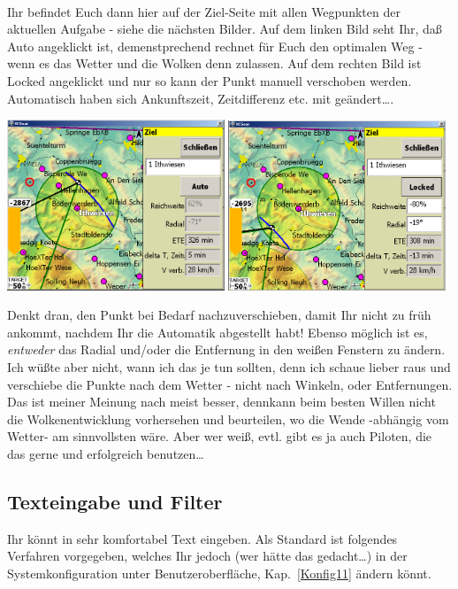 \blink~\blink~\blink~\bblitz


Ihr befindet Euch dann hier auf der \textsf{Ziel}-Seite mit allen Wegpunkten der aktuellen Aufgabe - siehe die nächsten Bilder. Auf dem linken Bild seht Ihr, daß \textsf{Auto} angeklickt ist, demenstprechend rechnet \xc für Euch den optimalen Weg - wenn es das Wetter und die Wolken denn zulassen. Auf dem rechten Bild ist  \textsf{Locked} angeklickt und nur so kann der  Punkt manuell verschoben werden. Automatisch haben sich Ankunftszeit, Zeitdifferenz etc. mit geändert\dots.
\begin{center}
\includegraphics[width=6.5cm]{Bilder/AAT-Verschieb0.png}%
\qquad
\includegraphics[width=6.5cm]{Bilder/AAT-Verschieb2.png}%
\end{center}

Denkt dran, den Punkt bei Bedarf nachzuverschieben, damit Ihr nicht zu früh ankommt, nachdem Ihr die Automatik abgestellt habt! Ebenso möglich ist es, \textsl{entweder} das Radial und/oder die Entfernung in den weißen Fenstern zu ändern. Ich wüßte aber nicht, wann ich das je tun sollten, denn ich schaue lieber raus und verschiebe die Punkte nach dem Wetter - nicht nach Winkeln, oder Entfernungen.
Das ist meiner Meinung nach meist besser, denn\xc kann beim besten Willen nicht die Wolkenentwicklung vorhersehen und beurteilen, wo die Wende -abhängig vom Wetter- am sinnvollsten wäre. Aber wer weiß, evtl. gibt es ja auch Piloten, die das gerne und erfolgreich benutzen\dots
%
\subsection{Texteingabe und Filter}\label{Texteingabe}\label{Filter}
Ihr könnt in \xc sehr komfortabel Text eingeben.  Als Standard ist folgendes Verfahren vorgegeben, welches Ihr jedoch (wer hätte das gedacht\dots) in der Systemkonfiguration unter Benutzeroberfläche, Kap.\  \ref{Konfig11} ändern könnt.


